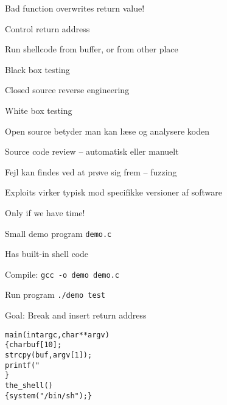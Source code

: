 \documentclass[Screen16to9,17pt]{foils}
\begin{document}



\begin{list2}
\item Bad function overwrites return value!
\item Control return address
\item Run shellcode from buffer, or from other place
\end{list2}




\begin{list1}
\item Black box testing
\item Closed source reverse engineering
\item White box testing
\item Open source betyder man kan læse og analysere koden
\item Source code review -- automatisk eller manuelt
\item Fejl kan findes ved at prøve sig frem -- fuzzing
\item Exploits virker typisk mod specifikke versioner af software
\end{list1}





Only if we have time!

\begin{list2}
\item Small demo program \verb+demo.c+
\item Has built-in shell code
\item Compile:
\verb+gcc -o demo demo.c+
\item Run program
\verb+./demo test+
\item Goal: Break and insert return address
\end{list2}

\begin{alltt}\small
main(int argc, char **argv)
\{      char buf[10];
        strcpy(buf, argv[1]);
        printf("%s\textbackslash{}n",buf);
\}
the_shell()
\{  system("/bin/sh");  \}
\end{alltt}


\end{document}
